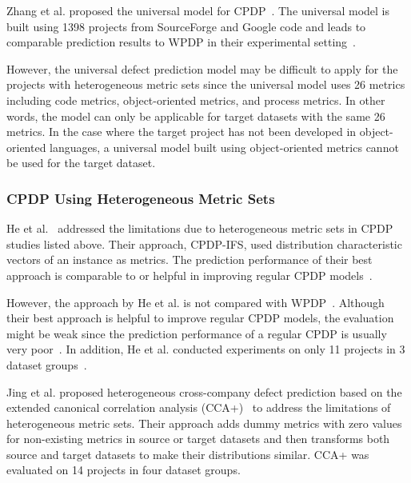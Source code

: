 Zhang et al. proposed the universal model for CPDP~\cite{Zhang14}.
The universal model is
built using 1398 projects from SourceForge and Google code and leads to
comparable prediction results to WPDP in their experimental
setting~\cite{Zhang14}.

However, the universal defect prediction model may be difficult to apply for the
projects with heterogeneous metric sets since the universal
model uses 26 metrics including code metrics, object-oriented metrics, and
process metrics. In other words, the model can only be applicable for
target datasets with the same 26 metrics. In the case where the target project
has not been developed in object-oriented languages, a universal model built
using object-oriented metrics cannot be used for the target dataset.

\subsubsection{CPDP Using Heterogeneous Metric Sets}
He et al.~\cite{He14} addressed the limitations due to
heterogeneous metric sets in CPDP studies listed
above.
Their approach, CPDP-IFS, used distribution
characteristic vectors of an instance as metrics.
The prediction performance of their best approach is comparable to or
helpful in improving regular CPDP models~\cite{He14}.

However, the approach by He et al. is not compared with WPDP~\cite{He14}.
Although their best approach is helpful to improve regular CPDP models, the
evaluation might be weak since the prediction performance of a regular CPDP is
usually very poor~\cite{Zimmermann09}. In addition, He et al. conducted
experiments on only 11 projects in 3 dataset groups~\cite{He14}.

Jing et al. proposed heterogeneous cross-company defect prediction based on the extended canonical correlation analysis (CCA+)~\cite{Jing15} to address the limitations of heterogeneous metric sets. Their approach adds dummy metrics with zero values for non-existing metrics in source or target datasets and then transforms both source and target datasets to make their distributions similar. CCA+ was evaluated on 14 projects in four dataset groups.

